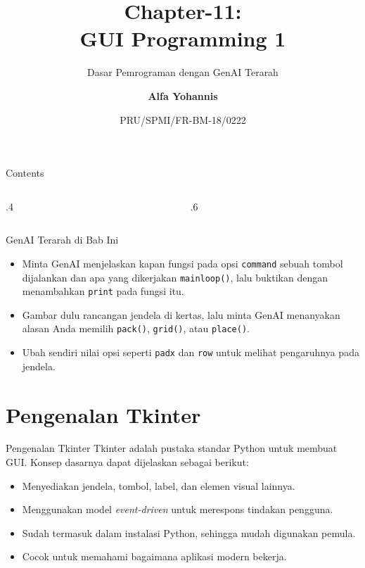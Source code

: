 \documentclass[aspectratio=169, table]{beamer}
\subtitle{Dasar Pemrograman dengan GenAI Terarah}
\title{Chapter-11:\\\LARGE{GUI Programming 1\\}
\vspace{10pt}}
\date[Serial]{\scriptsize {PRU/SPMI/FR-BM-18/0222}}
\author[Pradita]{\small{\textbf{Alfa Yohannis}}}
\begin{document}
\frame{\titlepage}

\begin{frame}[fragile]{Contents}
\vspace{15pt}
\begin{columns}[t]
\begin{column}{.4\textwidth}
\tableofcontents[sections={1-4}]
\end{column}
\begin{column}{.6\textwidth}
\tableofcontents[sections={5-8}]
\end{column}
\end{columns}
\end{frame}

\begin{frame}{GenAI Terarah di Bab Ini}
\small
\begin{itemize}
  \item Minta GenAI menjelaskan kapan fungsi pada opsi \texttt{command} sebuah tombol dijalankan dan apa yang dikerjakan \texttt{mainloop()}, lalu buktikan dengan menambahkan \texttt{print} pada fungsi itu.
  \item Gambar dulu rancangan jendela di kertas, lalu minta GenAI menanyakan alasan Anda memilih \texttt{pack()}, \texttt{grid()}, atau \texttt{place()}.
  \item Ubah sendiri nilai opsi seperti \texttt{padx} dan \texttt{row} untuk melihat pengaruhnya pada jendela.
\end{itemize}
\end{frame}

\section{Pengenalan Tkinter}
\begin{frame}[fragile]{Pengenalan Tkinter}
\vspace{20pt}
Tkinter adalah pustaka standar Python untuk membuat GUI.  
Konsep dasarnya dapat dijelaskan sebagai berikut:

\begin{itemize}
    \item Menyediakan jendela, tombol, label, dan elemen visual lainnya.
    \item Menggunakan model \textit{event-driven} untuk merespons tindakan pengguna.
    \item Sudah termasuk dalam instalasi Python, sehingga mudah digunakan pemula.
    \item Cocok untuk memahami bagaimana aplikasi modern bekerja.
\end{itemize}
\end{frame}
\end{document}
